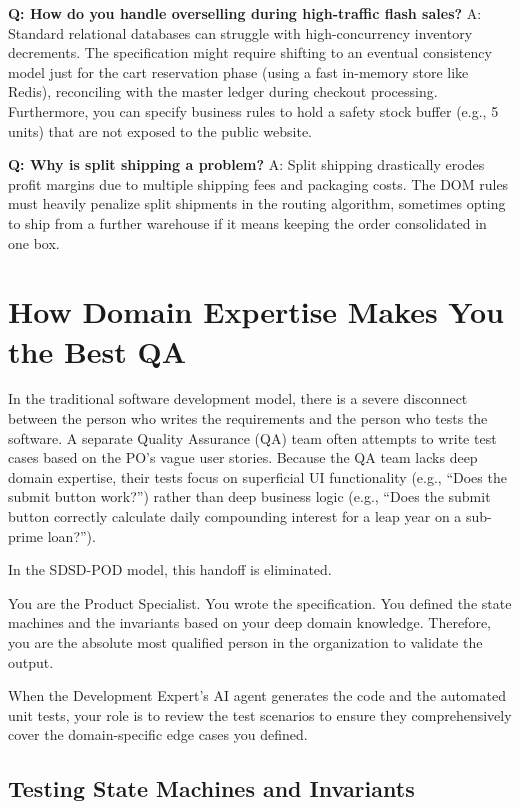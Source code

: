 \documentclass[
  11pt,
  openany,
  oneside]{book}
\begin{document}
\textbf{Q: How do you handle overselling during high-traffic flash
sales?} A: Standard relational databases can struggle with
high-concurrency inventory decrements. The specification might require
shifting to an eventual consistency model just for the cart reservation
phase (using a fast in-memory store like Redis), reconciling with the
master ledger during checkout processing. Furthermore, you can specify
business rules to hold a safety stock buffer (e.g., 5 units) that are
not exposed to the public website.

\textbf{Q: Why is split shipping a problem?} A: Split shipping
drastically erodes profit margins due to multiple shipping fees and
packaging costs. The DOM rules must heavily penalize split shipments in
the routing algorithm, sometimes opting to ship from a further warehouse
if it means keeping the order consolidated in one box.

\bigskip

\section{How Domain Expertise Makes You the Best
QA}\label{how-domain-expertise-makes-you-the-best-qa}

In the traditional software development model, there is a severe
disconnect between the person who writes the requirements and the person
who tests the software. A separate Quality Assurance (QA) team often
attempts to write test cases based on the PO's vague user stories.
Because the QA team lacks deep domain expertise, their tests focus on
superficial UI functionality (e.g., ``Does the submit button work?'')
rather than deep business logic (e.g., ``Does the submit button
correctly calculate daily compounding interest for a leap year on a
sub-prime loan?'').

In the SDSD-POD model, this handoff is eliminated.

You are the Product Specialist. You wrote the specification. You defined
the state machines and the invariants based on your deep domain
knowledge. Therefore, you are the absolute most qualified person in the
organization to validate the output.

When the Development Expert's AI agent generates the code and the
automated unit tests, your role is to review the test scenarios to
ensure they comprehensively cover the domain-specific edge cases you
defined.

\subsection{Testing State Machines and
Invariants}\label{testing-state-machines-and-invariants}
\end{document}
